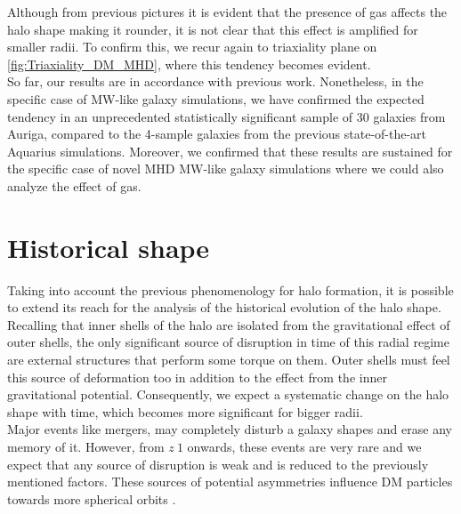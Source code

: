 Although from previous pictures it is evident that the presence of gas affects the halo shape making it rounder, it is not clear that this effect is amplified for smaller radii. To confirm this, we recur again to triaxiality plane on \ref{fig:Triaxiality_DM_MHD}, where this tendency becomes evident.\\

So far, our results are in accordance with previous work. Nonetheless, in the specific case of MW-like galaxy simulations, we have confirmed the expected tendency in an unprecedented statistically significant sample of 30 galaxies from Auriga, compared to the 4-sample galaxies from the previous state-of-the-art Aquarius simulations. Moreover, we confirmed that these results are sustained for the specific case of novel MHD MW-like galaxy simulations where we could also analyze the effect of gas.\\

\section{Historical shape}
Taking into account the previous phenomenology for halo formation, it is possible to extend 
its reach for the analysis of the historical evolution of the halo shape.\\

 Recalling that inner shells of the halo are isolated from the gravitational effect of outer shells, the only significant source of disruption in time of this radial regime are external structures that perform some torque on them. Outer shells must feel this source of deformation too in addition to the effect from the inner gravitational potential. Consequently, we expect a systematic change on the halo shape with time, which becomes more significant for bigger radii.\\
 
Major events like mergers, may completely disturb a galaxy shapes and erase any memory of it. However, from $z~1$ onwards, these events are very rare \cite{Tormen_et_al._1998} and we expect that any source of disruption is weak and is reduced to the previously mentioned factors. These sources of potential asymmetries influence DM particles towards more spherical orbits \cite{Debattista_et_al._2008}. \\  

